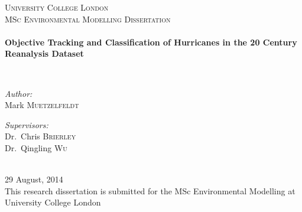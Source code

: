 \begin{titlepage}

\begin{center}

\textsc{\LARGE University College London}\\[1.5cm]

\textsc{\Large MSc Environmental Modelling Dissertation}\\[0.5cm]

\HRule \\[0.4cm]
{ \LARGE \bfseries Objective Tracking and Classification of Hurricanes in the 20 Century Reanalysis Dataset \\[0.4cm] }

\HRule \\[1.5cm]

\begin{minipage}{0.4\textwidth}
\begin{flushleft} \large
\emph{Author:}\\
Mark \textsc{Muetzelfeldt}
\end{flushleft}
\end{minipage}
\begin{minipage}{0.4\textwidth}
\begin{flushright} \large
\emph{Supervisors:} \\
Dr.~Chris \textsc{Brierley} \\
Dr.~Qingling \textsc{Wu}
\end{flushright}
\end{minipage}
\\[0.5cm]
29 August, 2014
\\[0.5cm]

This research dissertation is submitted for the MSc Environmental Modelling at University College London


\vfill

\end{center}

\end{titlepage}
